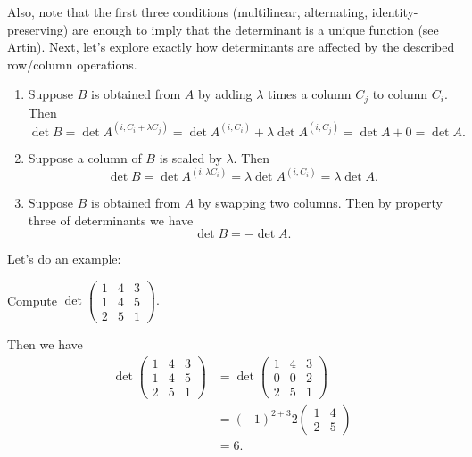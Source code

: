 \documentclass[main.tex]{subfiles}
\begin{document}
Also, note that the first three conditions (multilinear, alternating, identity-preserving) are enough to imply that the determinant is a unique function (see Artin). Next, let's explore exactly how determinants are affected by the described row/column operations.

\begin{enumerate}
    \item Suppose $B$ is obtained from $A$ by adding $\lambda$ times a column $C_j$ to column $C_i$. Then
    \[\det B = \det A^{(i, C_i + \lambda C_j)} = \det A^{(i, C_i)} + \lambda \det A^{(i, C_j)} = \det A + 0 = \boxed{\det A}.\]
    \item Suppose a column of $B$ is scaled by $\lambda$. Then
    \[\det B = \det A^{(i, \lambda C_i)} = \lambda\det A^{(i, C_i)} = \boxed{\lambda \det A}.\]
    \item Suppose $B$ is obtained from $A$ by swapping two columns. Then by property three of determinants we have
    \[\det B = \boxed{-\det A}.\]
\end{enumerate}

Let's do an example:
\begin{example}
    Compute $\det \begin{pmatrix}
        1 & 4 & 3 \\
        1 & 4 & 5 \\
        2 & 5 & 1
    \end{pmatrix}.$
\end{example}

Then we have
\begin{align*}
    \det \begin{pmatrix}
        1 & 4 & 3 \\
        1 & 4 & 5 \\
        2 & 5 & 1
    \end{pmatrix} &= \det \begin{pmatrix}
        1 & 4 & 3 \\
        0 & 0 & 2 \\
        2 & 5 & 1
    \end{pmatrix} \\
    &= (-1)^{2 + 3}2\begin{pmatrix}
        1 & 4 \\
        2 & 5
    \end{pmatrix} \\
    &= \boxed{6}.
\end{align*}
\end{document}
